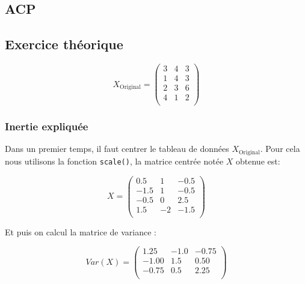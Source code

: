 \documentclass{article}
\begin{document}
\begin{multicols}{2}
\section{ACP}
	\subsection{Exercice théorique}
	\begin{equation*}       %
        X_{\text{Original}} =\left(                 %
            \begin{array}{ccc}   %
            3 & 4 & 3\\  %
            1 & 4 & 3\\  %
            2 & 3 & 6\\ 
            4 & 1 & 2\\ 
            \end{array}
        \right)%
	\end{equation*}
	\subsubsection{Inertie expliquée}
	
	Dans un premier temps, il faut centrer le tableau de données $ X_{\text{Original}}$. Pour cela nous utilisons la fonction \verb|scale()|, la matrice centrée notée $X$ obtenue est:
	
	\begin{equation*}       %
        X =\left(  
            \begin{array}{rrr} %
            0.5 & 1 & -0.5\\  %
            -1.5 & 1 & -0.5\\  %
            -0.5 & 0 & 2.5\\ 
            1.5 & -2 & -1.5\\ 
            \end{array}
        \right)%
    \end{equation*}
	
	Et puis on calcul la matrice de variance :
	
	\begin{equation*}       %
        Var(X) =\left(  
            \begin{array}{rrr}   %
            1.25 & -1.0 & -0.75\\ %
            -1.00 & 1.5 & 0.50\\  %
            -0.75 & 0.5 & 2.25\\ 
            \end{array}
        \right)%
    \end{equation*}
    

\end{multicols}
\end{document}
